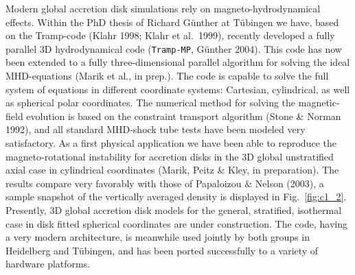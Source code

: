 Modern global accretion disk simulations rely on magneto-hydrodynamical
effects.  Within the PhD thesis of Richard G\"unther at T\"ubingen we have,
based on the Tramp-code (Klahr 1998; Klahr et al.\ 1999), recently developed
a fully parallel 3D hydrodynamical code ({\tt Tramp-MP}, G\"unther 2004).
This code has now been extended to a fully three-dimensional parallel
algorithm for solving the ideal MHD-equations (Marik et al., in prep.).  The
code is capable to solve the full system of equations in different
coordinate systems: Cartesian, cylindrical, as well as spherical polar
coordinates.  The numerical method for solving the magnetic-field evolution
is based on the constraint transport algorithm (Stone \& Norman 1992), and
all standard MHD-shock tube tests have been modeled very satisfactory.  As a
first physical application we have been able to reproduce the
magneto-rotational instability for accretion disks in the 3D global
unstratified axial case in cylindrical coordinates (Marik, Peitz \& Kley, in
preparation).  The results compare very favorably with those of Papaloizou
\& Nelson (2003), a sample snapshot of the vertically averaged density is
displayed in Fig.~\ref{fig:c1_2}.  Presently, 3D global accretion disk
models for the general, stratified, isothermal case in disk fitted spherical
coordinates are under construction.  The code, having a very modern
architecture, is meanwhile used jointly by both groups in Heidelberg and
T\"ubingen, and has been ported successfully to a variety of hardware
platforms.
 

